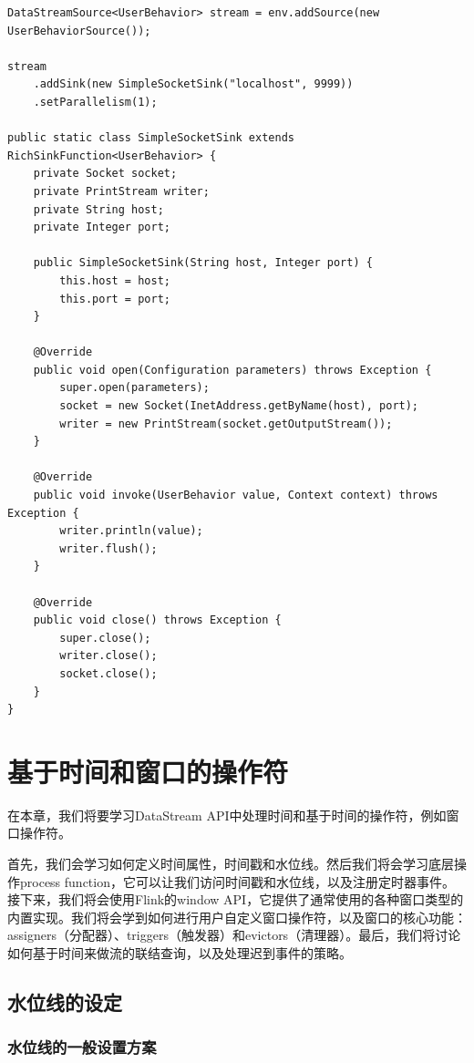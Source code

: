 \documentclass[cn,11pt,chinese]{elegantbook}
\begin{document}
\begin{verbatim}
DataStreamSource<UserBehavior> stream = env.addSource(new UserBehaviorSource());

stream
    .addSink(new SimpleSocketSink("localhost", 9999))
    .setParallelism(1);
    
public static class SimpleSocketSink extends RichSinkFunction<UserBehavior> {
    private Socket socket;
    private PrintStream writer;
    private String host;
    private Integer port;
    
    public SimpleSocketSink(String host, Integer port) {
        this.host = host;
        this.port = port;
    }
    
    @Override
    public void open(Configuration parameters) throws Exception {
        super.open(parameters);
        socket = new Socket(InetAddress.getByName(host), port);
        writer = new PrintStream(socket.getOutputStream());
    }
    
    @Override
    public void invoke(UserBehavior value, Context context) throws Exception {
        writer.println(value);
        writer.flush();
    }
    
    @Override
    public void close() throws Exception {
        super.close();
        writer.close();
        socket.close();
    }
}
\end{verbatim}

\chapter{基于时间和窗口的操作符}

在本章，我们将要学习DataStream API中处理时间和基于时间的操作符，例如窗口操作符。

首先，我们会学习如何定义时间属性，时间戳和水位线。然后我们将会学习底层操作process function，它可以让我们访问时间戳和水位线，以及注册定时器事件。接下来，我们将会使用Flink的window API，它提供了通常使用的各种窗口类型的内置实现。我们将会学到如何进行用户自定义窗口操作符，以及窗口的核心功能：assigners（分配器）、triggers（触发器）和evictors（清理器）。最后，我们将讨论如何基于时间来做流的联结查询，以及处理迟到事件的策略。

\section{水位线的设定}

\subsection{水位线的一般设置方案}
\end{document}

